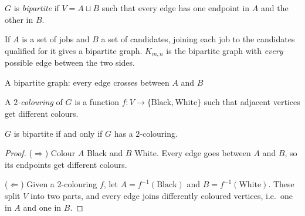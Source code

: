 \begin{definition}[Bipartite]
$G$ is \emph{bipartite} if $V=A\sqcup B$ such that every edge has one endpoint in $A$ and the other in $B$.
\end{definition}

\begin{example}
If $A$ is a set of jobs and $B$ a set of candidates, joining each job to the candidates qualified for it gives a bipartite graph. $K_{m,n}$ is the bipartite graph with \emph{every} possible edge between the two sides.
\end{example}

\begin{center}
\end{center}
\begin{center}
\small A bipartite graph: every edge crosses between $A$ and $B$
\end{center}

\begin{definition}[$2$-colouring]
A \emph{$2$-colouring} of $G$ is a function $f:V\to\{\text{Black},\text{White}\}$ such that adjacent vertices get different colours.
\end{definition}

\begin{proposition}
$G$ is bipartite if and only if $G$ has a $2$-colouring.
\end{proposition}
\begin{proof}
($\Rightarrow$) Colour $A$ Black and $B$ White. Every edge goes between $A$ and $B$, so its endpoints get different colours.

($\Leftarrow$) Given a $2$-colouring $f$, let $A=f^{-1}(\text{Black})$ and $B=f^{-1}(\text{White})$. These split $V$ into two parts, and every edge joins differently coloured vertices, i.e.\ one in $A$ and one in $B$.
\end{proof}

